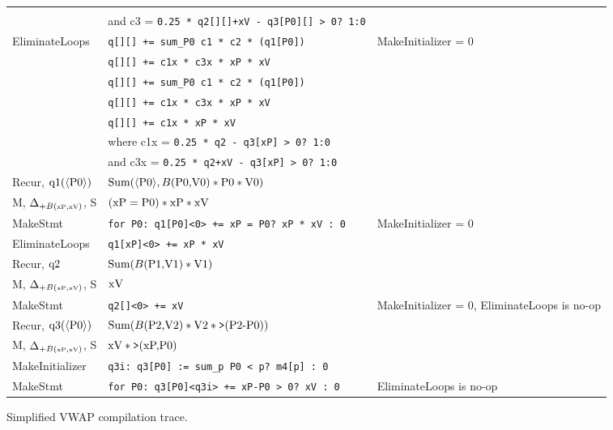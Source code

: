 \begin{figure*}
\begin{tabular}{l|l|l}
    &
\\
    & and c3 = \texttt{0.25 * q2[][]+xV - q3[P0][] > 0? 1:0}
    &
\\[1.5ex]
EliminateLoops
    & \texttt{q[][] += sum\_P0 c1 * c2 * (q1[P0])}
    & MakeInitializer = 0
\\
    & \texttt{q[][] += c1x * c3x * xP * xV}
    &
\\
    & \texttt{q[][] += sum\_P0 c1 * c2 * (q1[P0])}
    &
\\
    & \texttt{q[][] += c1x * c3x * xP * xV}
    &
\\
    & \texttt{q[][] += c1x * xP * xV}
    &
\\
    & where c1x = \texttt{0.25 * q2 - q3[xP] > 0? 1:0}
    &
\\
    & and c3x = \texttt{0.25 * q2+xV - q3[xP] > 0? 1:0}
    &
\\[1.5ex]
Recur, $\mbox{q1}({\langle\mbox{P0}\rangle})$
    & $\mbox{Sum}({\langle\mbox{P0}\rangle}, B(\mbox{P0,V0}) * \mbox{P0} * \mbox{V0})$
    &
\\
M,
$\Delta_{+B(\v{\tiny{xP}},\v{\tiny{xV}})}$,
S
   & $(\mbox{xP} = \mbox{P0}) * \mbox{xP} * \mbox{xV}$
   &
\\
MakeStmt
    & \texttt{for P0: q1[P0]<0> += xP = P0? xP * xV : 0}
    & MakeInitializer = 0
\\
EliminateLoops
    & \texttt{q1[xP]<0> += xP * xV}
    &
\\[1.5ex]
Recur, $\mbox{q2}$
    & $\mbox{Sum}(B(\mbox{P1,V1}) * \mbox{V1})$
    & 
\\
M,
$\Delta_{+B(\v{\tiny{xP}},\v{\tiny{xV}})}$,
S
   & $\mbox{xV}$
   &
\\
MakeStmt
    & \texttt{q2[]<0> += xV}
    & MakeInitializer = 0, EliminateLoops is no-op
\\[1.5ex]
Recur, $\mbox{q3}({\langle\mbox{P0}\rangle})$
    & $\mbox{Sum}(B(\mbox{P2,V2}) * \mbox{V2} * \mbox{{\tt >}}(\mbox{P2-P0}))$
    &    
\\
M,
$\Delta_{+B(\v{\tiny{xP}},\v{\tiny{xV}})}$,
S
   & $\mbox{xV} * \mbox{{\tt >}}(\mbox{xP,P0})$
   &
\\
MakeInitializer
    & \texttt{q3i: q3[P0] := sum\_p P0 < p? m4[p] : 0}
    &
\\
MakeStmt
    & \texttt{for P0: q3[P0]<q3i> += xP-P0 > 0? xV : 0 }
    & EliminateLoops is no-op
\end{tabular}
\caption{Simplified VWAP compilation trace.}
\label{fig:compilevwap}
\end{figure*}